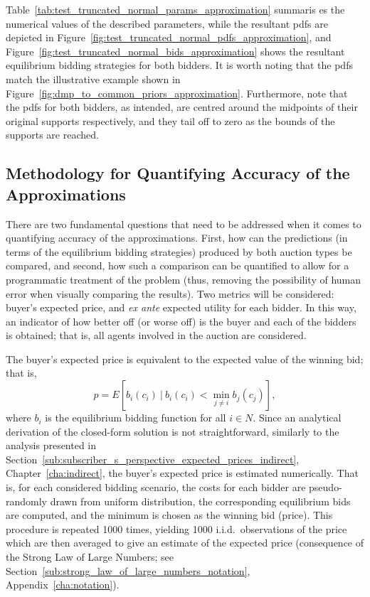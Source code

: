Table~\ref{tab:test_truncated_normal_params_approximation} summaris es the numerical values of the described parameters, while the resultant pdfs are depicted in Figure~\ref{fig:test_truncated_normal_pdfs_approximation}, and Figure~\ref{fig:test_truncated_normal_bids_approximation} shows the resultant equilibrium bidding strategies for both bidders. It is worth noting that the pdfs match the illustrative example shown in Figure~\ref{fig:dmp_to_common_priors_approximation}. Furthermore, note that the pdfs for both bidders, as intended, are centred around the midpoints of their original supports respectively, and they tail off to zero as the bounds of the supports are reached.

\subsection{Methodology for Quantifying Accuracy of the Approximations} %
\label{sub:methodology_for_quantifying_accuracy_of_the_approximations_approximation}
There are two fundamental questions that need to be addressed when it comes to quantifying accuracy of the approximations. First, how can the predictions (in terms of the equilibrium bidding strategies) produced by both auction types be compared, and second, how such a comparison can be quantified to allow for a programmatic treatment of the problem (thus, removing the possibility of human error when visually comparing the results). Two metrics will be considered: buyer's expected price, and \emph{ex ante} expected utility for each bidder. In this way, an indicator of how better off (or worse off) is the buyer and each of the bidders is obtained; that is, all agents involved in the auction are considered.

The buyer's expected price is equivalent to the expected value of the winning bid; that is,
\begin{equation}
  \label{eq:expected_price_approximation}
  p = E[b_i(c_i) \:\vert\: b_i(c_i) < \min_{j\neq i} b_j(c_j)],
\end{equation}
where $b_i$ is the equilibrium bidding function for all $i\in N$. Since an analytical derivation of the closed-form solution is not straightforward, similarly to the analysis presented in Section~\ref{sub:subscriber_s_perspective_expected_prices_indirect}, Chapter~\ref{cha:indirect}, the buyer's expected price is estimated numerically. That is, for each considered bidding scenario, the costs for each bidder are pseudo-randomly drawn from uniform distribution, the corresponding equilibrium bids are computed, and the minimum is chosen as the winning bid (price). This procedure is repeated 1000 times, yielding 1000 i.i.d.~observations of the price which are then averaged to give an estimate of the expected price (consequence of the Strong Law of Large Numbers; see Section~\ref{sub:strong_law_of_large_numbers_notation}, Appendix~\ref{cha:notation}).

